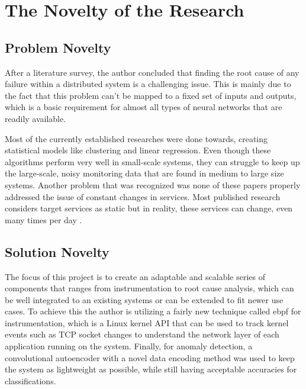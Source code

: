 \section{The Novelty of the Research}

\subsection{Problem Novelty}

After a literature survey, the author concluded that finding the root cause of any failure within a distributed system is a challenging issue. This is mainly due to the fact that this problem can't be mapped to a fixed set of inputs and outputs, which is a basic requirement for almost all types of neural networks that are readily available. 


Most of the currently established researches were done towards, creating statistical models like clustering and linear regression. Even though these algorithms perform very well in small-scale systems, they can struggle to keep up the large-scale, noisy monitoring data that are found in medium to large size systems. Another problem that was recognized was none of these papers properly addressed the issue of constant changes in services. Most published research considers target services as static but in reality, these services can change, even many times per day \citep{GoingtoM51:online}.

\subsection{Solution Novelty}


The focus of this project is to create an adaptable and scalable series of components that ranges from instrumentation to root cause analysis, which can be well integrated to an existing systems or can be extended to fit newer use cases. To achieve this the author is utilizing a fairly new technique called \ac{ebpf} for instrumentation, which is a Linux kernel API that can be used to track kernel events such as TCP socket changes to understand the network layer of each application running on the system. Finally, for anomaly detection, a convolutional autoencoder with a novel data encoding method was used to keep the system as lightweight as possible, while still having acceptable accuracies for classifications.